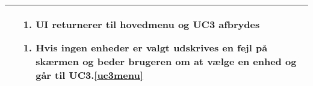 \begin{table}[H]
\begin{tabular}{|p{6cm}|p{8cm}|}
		&\begin{enumerate}[label= \ref{uc3deact}a.]
			\item UI returnerer til hovedmenu og UC3 afbrydes
		\end{enumerate}						
							
		\begin{enumerate}[label= \ref{uc3sysdeact}a.]
			\item Hvis ingen enheder er valgt udskrives en fejl på skærmen og beder brugeren om at vælge en enhed og går til UC3.\ref{uc3menu}
		\end{enumerate} \\\hline
											
		
	\end{tabular} 
\end{table}